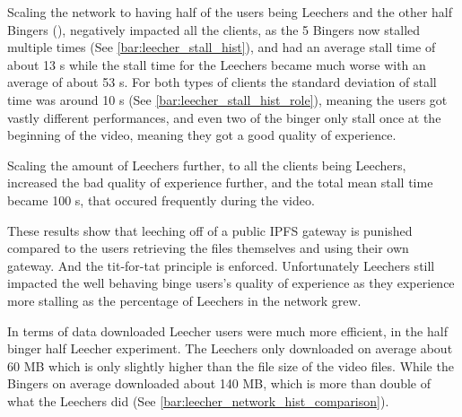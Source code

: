 \if{}



\fi

Scaling the network to having half of the users being Leechers and the other half Bingers (), negatively impacted all the clients, as the 5 Bingers now stalled multiple times (See \autoref{bar:leecher_stall_hist}), and had an average stall time of about 13 \ac{s} while the stall time for the Leechers became much worse with an average of about 53 \ac{s}. For both types of clients the standard deviation of stall time was around 10 \ac{s} (See \autoref{bar:leecher_stall_hist_role}), meaning the users got vastly different performances, and even two of the binger only stall once at the beginning of the video, meaning they got a good quality of experience.

\if{}


\fi
%

Scaling the amount of Leechers further, to all the clients being Leechers, increased the bad quality of experience further, and the total mean stall time became 100 \ac{s}, that occured frequently during the video.

These results show that leeching off of a public \ac{IPFS} gateway is punished compared to the users retrieving the files themselves and using their own gateway. And the tit-for-tat principle is enforced. Unfortunately Leechers still impacted the well behaving binge users's quality of experience as they experience more stalling as the percentage of Leechers in the network grew.

In terms of data downloaded Leecher users were much more efficient, in the half binger half Leecher experiment. The Leechers only downloaded on average about 60 \ac{MB} which is only slightly higher than the file size of the video files. While the Bingers on average downloaded about 140 \ac{MB}, which is more than double of what the Leechers did (See \autoref{bar:leecher_network_hist_comparison}). 

